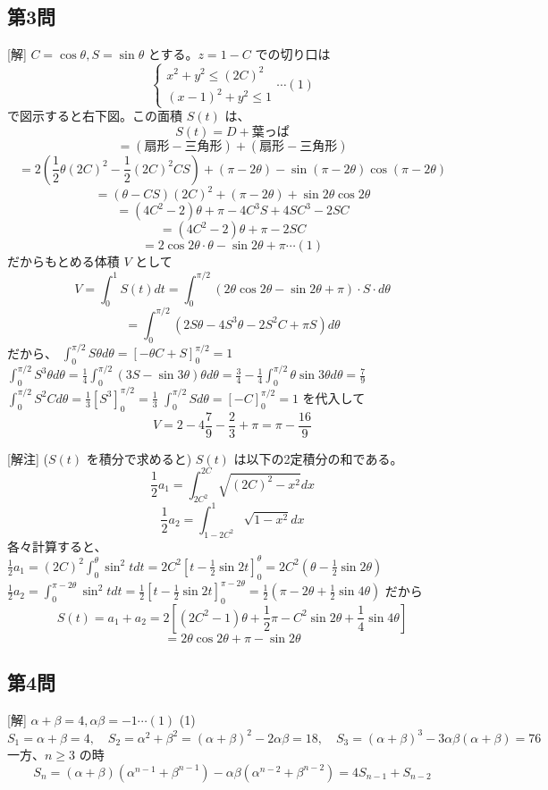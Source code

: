 \documentclass[../main.tex]{subfiles}
\begin{document}
\subsection*{第3問}
[解] $C = \cos \theta, S = \sin \theta$ とする。$z=1-C$ での切り口は
$$
\begin{cases} x^2+y^2 \le (2C)^2 \\ (x-1)^2+y^2 \le 1
\end{cases} \cdots (1) $$
で図示すると右下図。この面積 $S(t)$ は、
$$S(t) = D + \text{葉っぱ}$$
$$= (\text{扇形} - \text{三角形}) + (\text{扇形} - \text{三角形})$$
$$= 2 \left( \frac{1}{2} \theta (2C)^2 - \frac{1}{2}(2C)^2 CS \right) + (\pi - 2\theta) - \sin(\pi - 2\theta) \cos(\pi - 2\theta)$$
$$= (\theta - CS)(2C)^2 + (\pi - 2\theta) + \sin 2\theta \cos 2\theta$$
$$= (4C^2 - 2)\theta + \pi - 4C^3 S + 4SC^3 - 2SC$$
$$= (4C^2 - 2)\theta + \pi - 2SC$$
$$= 2\cos 2\theta \cdot \theta - \sin 2\theta + \pi \cdots (1)$$
だからもとめる体積 $V$ として
$$V = \int_0^1 S(t) dt = \int_0^{\pi/2} (2\theta \cos 2\theta - \sin 2\theta + \pi) \cdot S \cdot d\theta$$
$$= \int_0^{\pi/2} (2S\theta - 4S^3\theta - 2S^2C + \pi S) d\theta$$
だから、
$\int_0^{\pi/2} S\theta d\theta = [-\theta C + S]_0^{\pi/2} = 1$
$\int_0^{\pi/2} S^3\theta d\theta = \frac{1}{4} \int_0^{\pi/2} (3S - \sin 3\theta) \theta d\theta = \frac{3}{4} - \frac{1}{4} \int_0^{\pi/2} \theta \sin 3\theta d\theta = \frac{7}{9}$
$\int_0^{\pi/2} S^2C d\theta = \frac{1}{3} [S^3]_0^{\pi/2} = \frac{1}{3}$
$\int_0^{\pi/2} S d\theta = [-C]_0^{\pi/2} = 1$
を代入して
$$V = 2 - 4\frac{7}{9} - \frac{2}{3} + \pi = \pi - \frac{16}{9}$$

[解注] ($S(t)$ を積分で求めると)
$S(t)$ は以下の2定積分の和である。
$$\frac{1}{2}a_1 = \int_{2C^2}^{2C} \sqrt{(2C)^2-x^2} dx$$
$$\frac{1}{2}a_2 = \int_{1-2C^2}^1 \sqrt{1-x^2} dx$$
各々計算すると、
$\frac{1}{2}a_1 = (2C)^2 \int_0^\theta \sin^2 t dt = 2C^2 \left[ t - \frac{1}{2}\sin 2t \right]_0^\theta = 2C^2(\theta - \frac{1}{2}\sin 2\theta)$
$\frac{1}{2}a_2 = \int_0^{\pi-2\theta} \sin^2 t dt = \frac{1}{2} \left[ t - \frac{1}{2}\sin 2t \right]_0^{\pi-2\theta} = \frac{1}{2} (\pi - 2\theta + \frac{1}{2}\sin 4\theta)$
だから
$$S(t) = a_1 + a_2 = 2 \left[ (2C^2-1)\theta + \frac{1}{2}\pi - C^2 \sin 2\theta + \frac{1}{4}\sin 4\theta \right]$$
$$= 2\theta \cos 2\theta + \pi - \sin 2\theta$$

\subsection*{第4問}
[解] $\alpha+\beta=4, \alpha\beta=-1 \cdots (1)$
(1) $S_1 = \alpha+\beta = 4, \quad S_2 = \alpha^2+\beta^2 = (\alpha+\beta)^2-2\alpha\beta = 18, \quad S_3 = (\alpha+\beta)^3-3\alpha\beta(\alpha+\beta) = 76$
一方、$n \ge 3$ の時
$$S_n = (\alpha+\beta)(\alpha^{n-1}+\beta^{n-1}) - \alpha\beta(\alpha^{n-2}+\beta^{n-2}) = 4S_{n-1} + S_{n-2}$$
\end{document}
